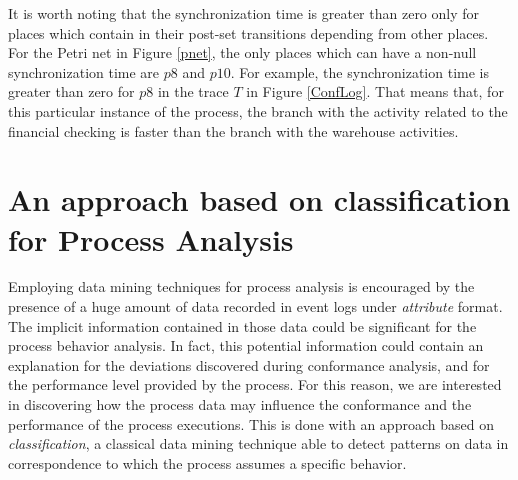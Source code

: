\documentclass{llncs}
\begin{document}

It is worth noting that the synchronization time is greater than zero only for places which contain in their post-set transitions depending from other places. For the Petri net in Figure \ref{pnet}, the only places which can have a non-null synchronization time are $p8$ and $p10$. For example, the synchronization time is greater than zero for $p8$ in the trace $T$ in Figure \ref{ConfLog}. That means that, for this particular instance of the process, the branch with the activity related to the financial checking is faster than the branch with the warehouse activities.

\section{An approach based on classification for Process Analysis}\label{ClassifApproach}
Employing data mining techniques for process analysis is encouraged by the presence of a huge amount of data recorded in event logs under \emph{attribute} format. The implicit information contained in those data could be significant for the process behavior analysis. In fact, this potential information could contain an explanation for the deviations discovered during conformance analysis, and for the performance level provided by the process. For this reason, we are interested in discovering how the process data may influence the conformance and the performance of the process executions. This is done with an approach based on \emph{classification}, a classical data mining technique able to detect patterns on data in correspondence to which the process assumes a specific behavior.
\end{document}
